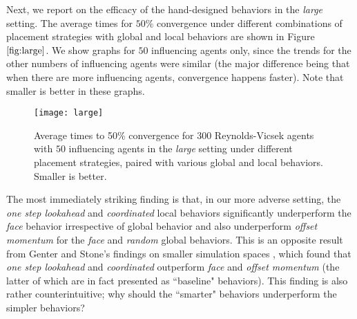 Next, we report on the efficacy of the hand-designed behaviors in the
\textit{large} setting.
The average times for $50\%$ convergence under different combinations of placement
strategies with global and local behaviors are shown in Figure $\ref{fig:large}$.
We show graphs for $50$ influencing agents only, since the trends for the other
numbers of influencing agents were similar (the major difference being that
when there are more influencing agents, convergence happens faster).
Note that smaller is better in these graphs.
\begin{figure}
    \texttt{[image: large]}
    \caption{Average times to 50\% convergence for $300$ Reynolds-Vicsek agents
    with $50$ influencing agents in the \textit{large} setting under different
    placement strategies, paired with various global and local behaviors.
    Smaller is better.}
    \label{fig:large}
\end{figure}
The most immediately striking finding is that, in our more adverse setting,
the \textit{one step lookahead} and \textit{coordinated} local behaviors
significantly underperform the \textit{face} behavior irrespective of global
behavior and also underperform \textit{offset momentum} for the \textit{face}
and \textit{random} global behaviors.
This is an opposite result from Genter and Stone's findings on smaller simulation
spaces \cite{genter201612steplookahead, genterthesis}, which found that
\textit{one step lookahead} and \textit{coordinated} outperform \textit{face}
and \textit{offset momentum} (the latter of which are in fact presented as
``baseline" behaviors).
This finding is also rather counterintuitive; why should the ``smarter" behaviors
underperform the simpler behaviors?

